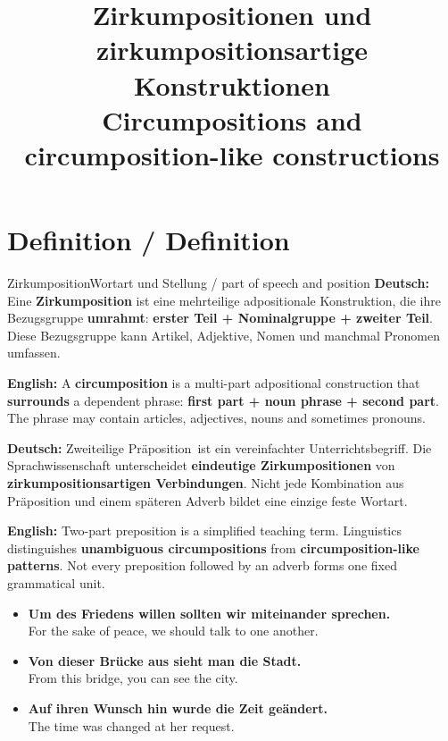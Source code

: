\documentclass[a4paper,11pt]{article}
\title{Zirkumpositionen und zirkumpositionsartige Konstruktionen\\ \large Circumpositions and circumposition-like constructions}
\date{}
\newcommand{\GermanText}[1]{\textbf{Deutsch: }#1\par}
\newcommand{\EnglishText}[1]{{\small\color{SoftGray}\textbf{English: }#1\par}}
\newcommand{\ExampleItem}[2]{\item \textbf{#1}\\{\small\color{SoftGray}#2}}
\begin{document}
\maketitle
\tableofcontents
\newpage

\section{Definition / Definition}
\begin{grammarentry}{Zirkumposition}{Wortart und Stellung / part of speech and position}
\GermanText{Eine \textbf{Zirkumposition} ist eine mehrteilige adpositionale Konstruktion, die ihre Bezugsgruppe \textbf{umrahmt}: \textbf{erster Teil + Nominalgruppe + zweiter Teil}. Diese Bezugsgruppe kann Artikel, Adjektive, Nomen und manchmal Pronomen umfassen.}
\EnglishText{A \textbf{circumposition} is a multi-part adpositional construction that \textbf{surrounds} a dependent phrase: \textbf{first part + noun phrase + second part}. The phrase may contain articles, adjectives, nouns and sometimes pronouns.}
\GermanText{\glqq Zweiteilige Präposition\grqq\ ist ein vereinfachter Unterrichtsbegriff. Die Sprachwissenschaft unterscheidet \textbf{eindeutige Zirkumpositionen} von \textbf{zirkumpositionsartigen Verbindungen}. Nicht jede Kombination aus Präposition und einem späteren Adverb bildet eine einzige feste Wortart.}
\EnglishText{Two-part preposition is a simplified teaching term. Linguistics distinguishes \textbf{unambiguous circumpositions} from \textbf{circumposition-like patterns}. Not every preposition followed by an adverb forms one fixed grammatical unit.}
\end{grammarentry}
\begin{exbox}\begin{itemize}
\ExampleItem{Um des Friedens willen sollten wir miteinander sprechen.}{For the sake of peace, we should talk to one another.}
\ExampleItem{Von dieser Brücke aus sieht man die Stadt.}{From this bridge, you can see the city.}
\ExampleItem{Auf ihren Wunsch hin wurde die Zeit geändert.}{The time was changed at her request.}
\end{itemize}\end{exbox}
\end{document}
